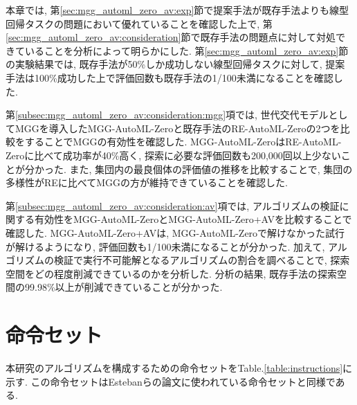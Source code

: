 \documentclass[11pt,oneside,openany,report]{jsbook}
\begin{document}
本章では, 第\ref{sec:mgg_automl_zero_av:exp}節で提案手法が既存手法よりも線型回帰タスクの問題において優れていることを確認した上で, 第\ref{sec:mgg_automl_zero_av:consideration}節で既存手法の問題点に対して対処できていることを分析によって明らかにした. 第\ref{sec:mgg_automl_zero_av:exp}節の実験結果では, 既存手法が50\%しか成功しない線型回帰タスクに対して, 提案手法は100\%成功した上で評価回数も既存手法の1/100未満になることを確認した.

第\ref{subsec:mgg_automl_zero_av:consideration:mgg}項では, 世代交代モデルとしてMGGを導入したMGG-AutoML-Zeroと既存手法のRE-AutoML-Zeroの2つを比較をすることでMGGの有効性を確認した. MGG-AutoML-ZeroはRE-AutoML-Zeroに比べて成功率が40\%高く, 探索に必要な評価回数も200,000回以上少ないことが分かった. また, 集団内の最良個体の評価値の推移を比較することで, 集団の多様性がREに比べてMGGの方が維持できていることを確認した.

第\ref{subsec:mgg_automl_zero_av:consideration:av}項では, アルゴリズムの検証に関する有効性をMGG-AutoML-ZeroとMGG-AutoML-Zero+AVを比較することで確認した. MGG-AutoML-Zero+AVは, MGG-AutoML-Zeroで解けなかった試行が解けるようになり, 評価回数も1/100未満になることが分かった. 加えて, アルゴリズムの検証で実行不可能解となるアルゴリズムの割合を調べることで, 探索空間をどの程度削減できているのかを分析した. 分析の結果, 既存手法の探索空間の99.98\%以上が削減できていることが分かった.

\appendix

\chapter{命令セット}

本研究のアルゴリズムを構成するための命令セットをTable.\ref{table:instructions}に示す. この命令セットはEstebanらの論文\cite{automl_zero}に使われている命令セットと同様である.
\end{document}
